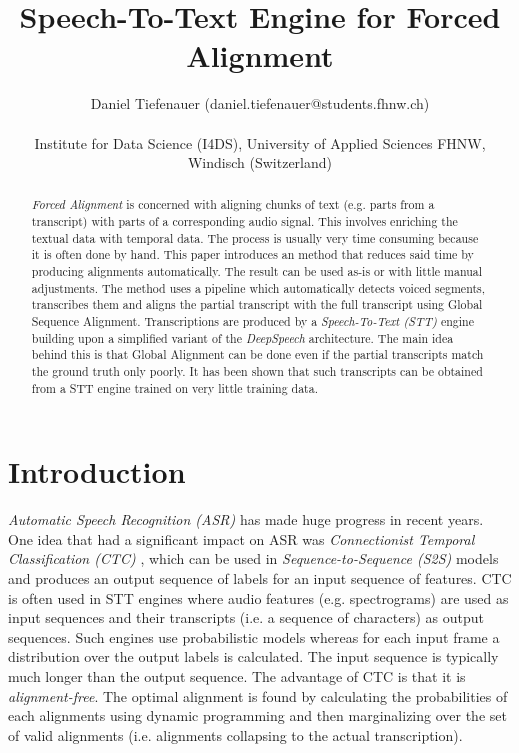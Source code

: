 \documentclass[letterpaper]{article}
\title{Speech-To-Text Engine for Forced Alignment}
\author{Daniel Tiefenauer (daniel.tiefenauer@students.fhnw.ch)\\
\mbox{}\\
Institute for Data Science (I4DS), University of Applied Sciences FHNW, Windisch (Switzerland)}
\begin{document}
	
\maketitle

\begin{abstract}
\textit{Forced Alignment} is concerned with aligning chunks of text (e.g. parts from a transcript) with parts of a corresponding audio signal. This involves enriching the textual data with temporal data. The process is usually very time consuming because it is often done by hand. This paper introduces an method that reduces said time by producing alignments automatically. The result can be used as-is or with little manual adjustments. The method uses a pipeline which automatically detects voiced segments, transcribes them and aligns the partial transcript with the full transcript using Global Sequence Alignment. Transcriptions are produced by a \textit{Speech-To-Text (STT)} engine building upon a simplified variant of the \textit{DeepSpeech} architecture. The main idea behind this is that Global Alignment can be done even if the partial transcripts match the ground truth only poorly. It has been shown that such transcripts can be obtained from a STT engine trained on very little training data.
\end{abstract}

\section{Introduction}
\textit{Automatic Speech Recognition (ASR)} has made huge progress in recent years. One idea that had a significant impact on ASR was \textit{Connectionist Temporal Classification (CTC)} \parencite{ctc_paper}, which can be used in \textit{Sequence-to-Sequence (S2S)} models and produces an output sequence of labels for an input sequence of features. CTC is often used in STT engines where audio features (e.g. spectrograms) are used as input sequences and their transcripts (i.e. a sequence of characters) as output sequences. Such engines use probabilistic models whereas for each input frame a distribution over the output labels is calculated. The input sequence is typically much longer than the output sequence. The advantage of CTC is that it is \textit{alignment-free}. The optimal alignment is found by calculating the probabilities of each alignments using dynamic programming and then marginalizing over the set of valid alignments (i.e. alignments collapsing to the actual transcription). 
\end{document}
